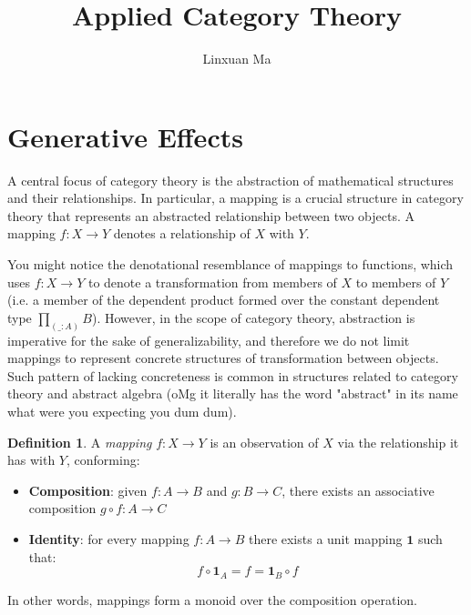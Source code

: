 \documentclass[12pt]{article}
\title{Applied Category Theory}
\author{Linxuan Ma}
\theoremstyle{definition}
\newtheorem{defn}{Definition }[section]
\begin{document}
	\maketitle
	
	
	\section{Generative Effects}
	
	A central focus of category theory is the abstraction of mathematical structures and their relationships. In particular, a mapping is a crucial structure in category theory that represents an abstracted relationship between two objects. A mapping $f: X \to Y$ denotes a relationship of $X$ with $Y$.
	
	You might notice the denotational resemblance of mappings to functions, which uses $f: X \to Y$ to denote a transformation from members of $X$ to members of $Y$ (i.e. a member of the dependent product formed over the constant dependent type $\prod_{(\_:A)}B$). However, in the scope of category theory, abstraction is imperative for the sake of generalizability, and therefore we do not limit mappings to represent concrete structures of transformation between objects. Such pattern of lacking concreteness is common in structures related to category theory and abstract algebra (oMg it literally has the word "abstract" in its name what were you expecting you dum dum).
	
	\begin{defn}
		A \emph{mapping} $f: X \to Y$ is an observation of $X$ via the relationship it has with $Y$, conforming:
		\begin{itemize}
			\item \textbf{Composition}: given $f: A \to B$ and $g: B \to C$, there exists an associative composition $g \circ f: A \to C$
			\item \textbf{Identity}: for every mapping $f: A \to B$ there exists a unit mapping $\textbf{1}$ such that: $$f \circ \textbf{1}_A = f = \textbf{1}_B \circ f$$
		\end{itemize}
	\end{defn}
	
	In other words, mappings form a monoid over the composition operation.
	
\end{document}
